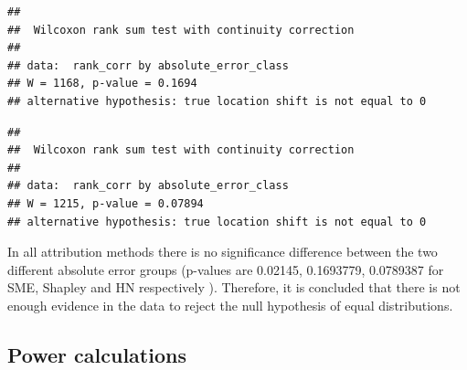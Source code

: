 \documentclass[
  12pt,
  a4paper]{article}
\newenvironment{Shaded}{\begin{snugshade}}{\end{snugshade}}
\newcommand{\CommentTok}[1]{\textcolor[rgb]{0.56,0.35,0.01}{\textit{#1}}}
\newcommand{\FunctionTok}[1]{\textcolor[rgb]{0.13,0.29,0.53}{\textbf{#1}}}
\newcommand{\NormalTok}[1]{#1}
\newcommand{\OtherTok}[1]{\textcolor[rgb]{0.56,0.35,0.01}{#1}}
\newcommand{\SpecialCharTok}[1]{\textcolor[rgb]{0.81,0.36,0.00}{\textbf{#1}}}
\newcommand{\StringTok}[1]{\textcolor[rgb]{0.31,0.60,0.02}{#1}}
\begin{document}
\begin{verbatim}
## 
##  Wilcoxon rank sum test with continuity correction
## 
## data:  rank_corr by absolute_error_class
## W = 1168, p-value = 0.1694
## alternative hypothesis: true location shift is not equal to 0
\end{verbatim}

\begin{verbatim}
## 
##  Wilcoxon rank sum test with continuity correction
## 
## data:  rank_corr by absolute_error_class
## W = 1215, p-value = 0.07894
## alternative hypothesis: true location shift is not equal to 0
\end{verbatim}

In all attribution methods there is no significance difference between
the two different absolute error groups (p-values are 0.02145,
0.1693779, 0.0789387 for SME, Shapley and HN respectively ). Therefore,
it is concluded that there is not enough evidence in the data to reject
the null hypothesis of equal distributions.

\hypertarget{power-calculations}{%
\subsection{Power calculations}\label{power-calculations}}

\begin{Shaded}
\end{Shaded}
\end{document}

